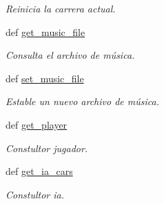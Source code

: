 \begin{DoxyCompactItemize}
\begin{DoxyCompactList}\small\item\em \-Reinicia la carrera actual. \end{DoxyCompactList}\item 
def \hyperlink{classengine_1_1gamecontrol_1_1GameControl_ad480dbd4fb553b63f537877fa4618746}{get\-\_\-music\-\_\-file}
\begin{DoxyCompactList}\small\item\em \-Consulta el archivo de música. \end{DoxyCompactList}\item 
def \hyperlink{classengine_1_1gamecontrol_1_1GameControl_a567d83b3a136b088101689a4f2ca24f6}{set\-\_\-music\-\_\-file}
\begin{DoxyCompactList}\small\item\em \-Estable un nuevo archivo de música. \end{DoxyCompactList}\item 
def \hyperlink{classengine_1_1gamecontrol_1_1GameControl_aa3e5004491ef1dbedbfaa47e84598d14}{get\-\_\-player}
\begin{DoxyCompactList}\small\item\em \-Constultor jugador. \end{DoxyCompactList}\item 
def \hyperlink{classengine_1_1gamecontrol_1_1GameControl_afa2cb69ab6df9fd45baf782db11ca950}{get\-\_\-ia\-\_\-cars}
\begin{DoxyCompactList}\small\item\em \-Constultor ia. \end{DoxyCompactList}\end{DoxyCompactItemize}
